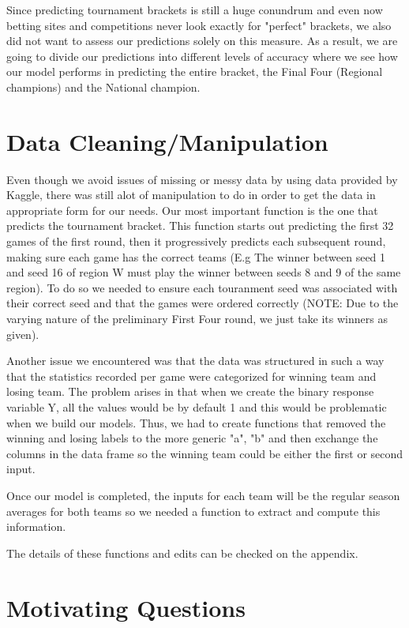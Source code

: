 \documentclass{article} %
\begin{document}
Since predicting tournament brackets is still a huge conundrum and even now betting sites and competitions never look exactly for "perfect" brackets, we also did not want to assess our predictions solely on this measure. As a result, we are going to divide our predictions into different levels of accuracy where we see how our model performs in predicting the entire bracket, the Final Four (Regional champions) and the National champion.

\section{Data Cleaning/Manipulation}

Even though we avoid issues of missing or messy data by using data provided by Kaggle, there was still alot of manipulation to do in order to get the data in appropriate form for our needs. Our most important function is the one that predicts the tournament bracket. This function starts out predicting the first 32 games of the first round, then it progressively predicts each subsequent round, making sure each game has the correct teams (E.g The winner between seed 1 and seed 16 of region W must play the winner between seeds 8 and 9 of the same region). To do so we needed to ensure each touranment seed was associated with their correct seed and that the games were ordered correctly (NOTE: Due to the varying nature of the preliminary First Four round, we just take its winners as given).

Another issue we encountered was that the data was structured in such a way that the statistics recorded per game were categorized for winning team and losing team. The problem arises in that when we create the binary response variable Y, all the values would be by default 1 and this would be problematic when we build our models. Thus, we had to create functions that removed the winning and losing labels to the more generic "a", "b" and then exchange the columns in the data frame so the winning team could be either the first or second input.

Once our model is completed, the inputs for each team will be the regular season averages for both teams so we needed a function to extract and compute this information.

The details of these functions and edits can be checked on the appendix.

\section{Motivating Questions}
\end{document}

